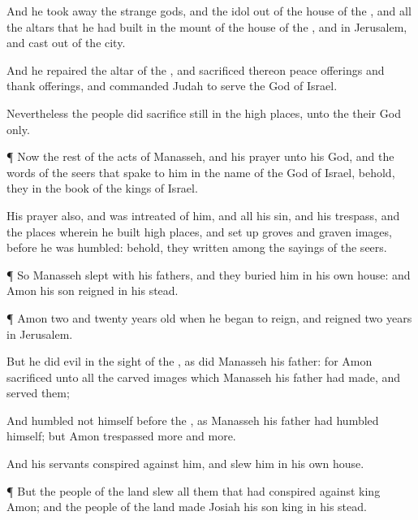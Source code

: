 {And he took
away the
strange
gods, and the
idol out of the
house of the
{}, and all the
altars that he had
built in the
mount of the
house of the
{}, and in
Jerusalem, and
cast
{}
out of the
city.

And he
repaired the
altar of the
{}, and
sacrificed thereon
peace
offerings and thank
offerings, and
commanded
Judah to
serve the
{}
God of
Israel.

Nevertheless the
people did
sacrifice still in the high
places,
{} unto the
{} their
God only.


\par }{\PP {}¶ Now the
rest of the
acts of
Manasseh, and his
prayer unto his
God, and the
words of the
seers that
spake to him in the
name of the
{}
God of
Israel, behold, they
{} in the
book of the
kings of
Israel.

His
prayer also, and
{} was
intreated of him, and all his
sin, and his
trespass, and the
places wherein he
built high
places, and set
up
groves and graven
images,
before he was
humbled: behold, they
{}
written among the
sayings of the
seers.


\par }{\PP {}¶ So
Manasseh
slept with his
fathers, and they
buried him in his own
house: and
Amon his
son
reigned in his stead.


\par }{\PP {}¶
Amon
{}
two and
twenty
years
old when he began to
reign, and
reigned
two
years in
Jerusalem.

But he
did
{}
evil in the
sight of the
{}, as
did
Manasseh his
father: for
Amon
sacrificed unto all the carved
images which
Manasseh his
father had
made, and
served them;

And
humbled not himself
before the
{}, as
Manasseh his
father had
humbled himself; but
Amon
trespassed more and
more.

And his
servants
conspired against him, and
slew him in his own
house.


\par }{\PP {}¶ But the
people of the
land
slew all them that had
conspired against
king
Amon; and the
people of the
land
made
Josiah his
son
king in his stead.




}
